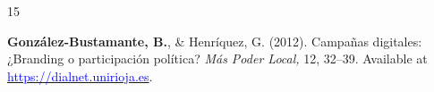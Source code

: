 \begin{publications}
\begin{benumerate}{15}

\item{{\bfseries González-Bustamante, B.}, \& Henríquez, G. (2012). Campañas digitales: ¿Branding o participación política? {\itshape Más Poder Local,} 12, 32--39. Available at \href{https://dialnet.unirioja.es/servlet/articulo?codigo=4013864}{\textcolor{blue}{https://dialnet.unirioja.es}}.} \vspace{1mm} %

\end{benumerate}

\end{publications}
